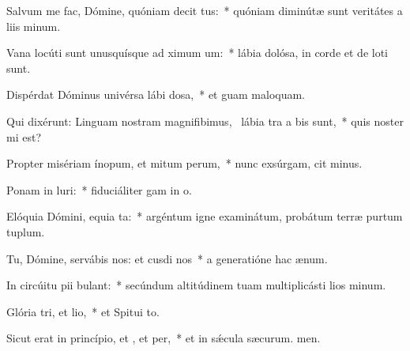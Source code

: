 \item Salvum me fac, Dómine, quóniam decit tus:~* quóniam diminútæ sunt veritátes a liis minum.
\item Vana locúti sunt unusquísque ad ximum um:~* lábia dolósa, in corde et de loti sunt.
\item Dispérdat Dóminus univérsa lábi dosa,~* et guam maloquam.
\item Qui dixérunt: Linguam nostram magnifibimus,~\pscross{} lábia tra a bis sunt,~* quis noster mi est?
\item Propter misériam ínopum, et mitum perum,~* nunc exsúrgam, cit minus.
\item Ponam in luri:~* fiduciáliter gam in o.
\item Elóquia Dómini, equia ta:~* argéntum igne examinátum, probátum terræ purtum tuplum.
\item Tu, Dómine, servábis nos: et cusdi nos~* a generatióne hac  ænum.
\item In circúitu pii bulant:~* secúndum altitúdinem tuam multiplicásti lios minum.
\item Glória tri, et lio,~* et Spitui to.
\item Sicut erat in princípio, et , et per,~* et in sǽcula sæcurum. men.
